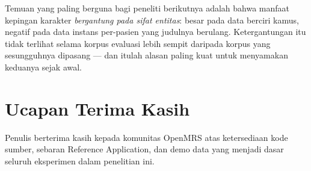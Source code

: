 \documentclass[journal,twoside,web]{ieeecolor}
\begin{document}
Temuan yang paling berguna bagi peneliti berikutnya adalah bahwa manfaat kepingan
karakter \emph{bergantung pada sifat entitas}: besar pada data berciri kamus,
negatif pada data instans per-pasien yang judulnya berulang. Ketergantungan itu
tidak terlihat selama korpus evaluasi lebih sempit daripada korpus yang
sesungguhnya dipasang --- dan itulah alasan paling kuat untuk menyamakan
keduanya sejak awal.

\section*{Ucapan Terima Kasih}

Penulis berterima kasih kepada komunitas OpenMRS atas ketersediaan kode sumber,
sebaran Reference Application, dan demo data yang menjadi dasar seluruh
eksperimen dalam penelitian ini.
\end{document}
